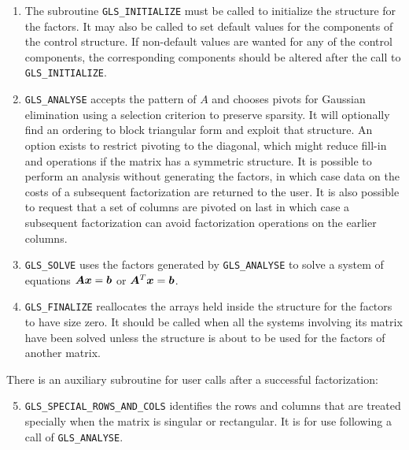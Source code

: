 \documentclass{galahad}
\newcommand{\packagename}{GLS}
\begin{document}
\begin{enumerate}

\item The subroutine {\tt \packagename\_INITIALIZE} must be 
called to initialize the
structure for the factors. It may also be called to set default values
for the components of the control structure. If non-default values are
wanted for any of the control components, the corresponding components
should be altered after the call to {\tt \packagename\_INITIALIZE}.
 
\item {\tt \packagename\_ANALYSE} accepts the pattern of $A$ and chooses
pivots for Gaussian elimination using a selection criterion to preserve
sparsity.  It will optionally find an ordering to block triangular form
and exploit that structure. An option exists to restrict pivoting to the
diagonal, which might reduce fill-in and operations if the matrix has a
symmetric structure. It is possible to perform an analysis without
generating the factors, in which case data on the costs of a subsequent
factorization are returned to the user.  It is also possible to request
that a set of columns are pivoted on last in which case a subsequent
factorization can avoid factorization operations on the earlier columns.

\item {\tt \packagename\_SOLVE} uses the factors generated by 
{\tt \packagename\_ANALYSE} to
solve a system of equations ${\bm{A}} {\bm{x}} = {\bm{b}}$ or ${\bm{A}}^T {\bm{x}} = {\bm{b}}$.

\item {\tt \packagename\_FINALIZE} reallocates the arrays held inside
the structure for the factors to have size zero. It should be called
when all the systems involving its matrix have been solved unless the
structure is about to be used for the factors of another matrix.

\end{enumerate}

\noindent There is an auxiliary subroutine for user calls after a 
successful factorization:

\begin{enumerate}
\setcounter{enumi}{4}

\item {\tt \packagename\_SPECIAL\_ROWS\_AND\_COLS} identifies the rows
and columns that are treated specially when the matrix is singular or
rectangular.  It is for use following a call of {\tt \packagename\_ANALYSE}.

\end{enumerate}
\end{document}
